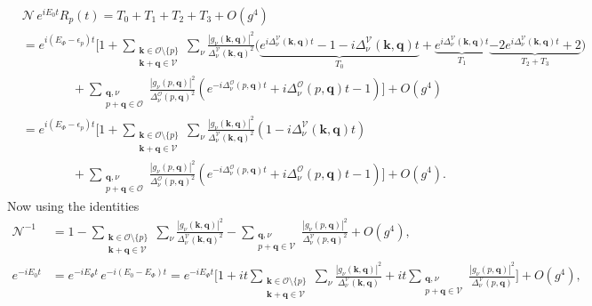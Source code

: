 \begin{align}
&\mathcal N\,e^{iE_0t}R_p(t)=T_0+T_1+T_2+T_3+O(g^4)\\
&=e^{i(E_\Phi-\epsilon_p)t}\Bigg[1
+\sum_{\substack{\bm k\in\mathcal O\setminus\{p\}\\ \bm k+\bm q\in\mathcal V}}\sum_\nu\frac{|g_\nu(\bm k,\bm q)|^2}{\Delta^{\mathcal V}_\nu(\bm k,\bm q)^2}
\Big(\underbrace{e^{i\Delta^{\mathcal V}_\nu(\bm k,\bm q)t}-1-i\Delta^{\mathcal V}_\nu(\bm k,\bm q)t}_{T_0}
+\underbrace{e^{i\Delta^{\mathcal V}_\nu(\bm k,\bm q)t}}_{T_1}
\underbrace{-2e^{i\Delta^{\mathcal V}_\nu(\bm k,\bm q)t}+2}_{T_2+T_3}\Big)\nonumber\\
&\qquad\qquad+\sum_{\substack{\bm q,\nu\\ p+\bm q\in\mathcal O}}\frac{|g_\nu(p,\bm q)|^2}{\Delta^{\mathcal O}_\nu(p,\bm q)^2}\left(e^{-i\Delta^{\mathcal O}_\nu(p,\bm q)t}+i\Delta^{\mathcal O}_\nu(p,\bm q)t-1\right)\Bigg]+O(g^4)\\
&=e^{i(E_\Phi-\epsilon_p)t}\Bigg[1
+\sum_{\substack{\bm k\in\mathcal O\setminus\{p\}\\ \bm k+\bm q\in\mathcal V}}\sum_\nu\frac{|g_\nu(\bm k,\bm q)|^2}{\Delta^{\mathcal V}_\nu(\bm k,\bm q)^2}
\left(1-i\Delta^{\mathcal V}_\nu(\bm k,\bm q)t\right)\nonumber\\
&\qquad\qquad+\sum_{\substack{\bm q,\nu\\ p+\bm q\in\mathcal O}}\frac{|g_\nu(p,\bm q)|^2}{\Delta^{\mathcal O}_\nu(p,\bm q)^2}\left(e^{-i\Delta^{\mathcal O}_\nu(p,\bm q)t}+i\Delta^{\mathcal O}_\nu(p,\bm q)t-1\right)\Bigg]+O(g^4).
\end{align}
Now using the identities
\begin{align}
    \mathcal N^{-1}&=1-\sum_{\substack{\bm k\in\mathcal O\setminus\{p\}\\ \bm k+\bm q\in\mathcal V}}\sum_\nu\frac{|g_\nu(\bm k,\bm q)|^2}{\Delta^{\mathcal V}_\nu(\bm k,\bm q)^2}
-\sum_{\substack{\bm q,\nu\\ p+\bm q\in\mathcal V}}\frac{|g_\nu(p,\bm q)|^2}{\Delta^{\mathcal V}_\nu(p,\bm q)^2}+O(g^4),\\
e^{-iE_0t}&=e^{-iE_\Phi t}\,e^{-i(E_0-E_\Phi)t}
=e^{-iE_\Phi t}\Bigg[1+it\sum_{\substack{\bm k\in\mathcal O\setminus\{p\}\\ \bm k+\bm q\in\mathcal V}}\sum_\nu\frac{|g_\nu(\bm k,\bm q)|^2}{\Delta^{\mathcal V}_\nu(\bm k,\bm q)}
+it\sum_{\substack{\bm q,\nu\\ p+\bm q\in\mathcal V}}\frac{|g_\nu(p,\bm q)|^2}{\Delta^{\mathcal V}_\nu(p,\bm q)}\Bigg]+O(g^4),
\end{align}
